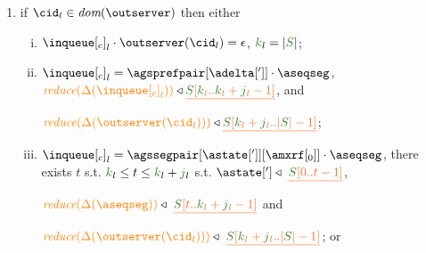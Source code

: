 \begin{definition}
\begin{enumerate}
%
%	


	
\item \label{prop_inclient} if $\cid_l \in \dom{\outserver}$ then either

    \begin{enumerate}[i.]
     \item ${\inclient}_l \cdot \outserver(\cid_l)  = \epsilon$, $\tknown_l = |\queuemessage|$; %

     \item ${\inclient}_l = \agsprefpair[{\adelta[']}]\cdot\aseqseg$,
      	$\ireduce{\igetdeltas{{\inclient}_l}}\triangleleft \flatten{ \queuemessage[\tknown_l..\tknown_l+\treceivebuffer_l-1]}$, and
      
     	 $\ireduce{\igetdeltas{\outserver(\cid_l)}}\triangleleft 
      	 \flatten{\queuemessage[\tknown_l+\treceivebuffer_l..|\queuemessage| - 1]}$;
  
     \item ${\inclient}_l = \agssegpair[{\astate[']}][{\amxrf[_0]}]\cdot\aseqseg$,      
  		 there exists $t$ s.t. $\tknown_l\leq t \leq \tknown_l+\treceivebuffer_l$ s.t. $\astate['] \triangleleft \ \flatten{\queuemessage[0 .. t - 1]}$, 
    
    		 $\ireduce{\igetdeltas{\aseqseg}}\triangleleft \ \flatten{ \queuemessage[t..\tknown_l+\treceivebuffer_l-1]}$ and 
     
     		$\ireduce{\igetdeltas{\outserver(\cid_l) }}\triangleleft \
       				\flatten{\queuemessage[\tknown_l+\treceivebuffer_l..|\queuemessage| - 1]}$; or
      

\end{enumerate}
\end{enumerate}
\end{definition}
